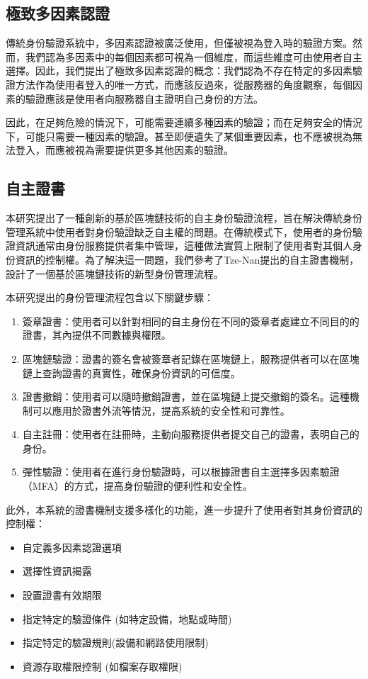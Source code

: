 \subsection{極致多因素認證}
傳統身份驗證系統中，多因素認證被廣泛使用，但僅被視為登入時的驗證方案。然而，我們認為多因素中的每個因素都可視為一個維度，而這些維度可由使用者自主選擇。因此，我們提出了極致多因素認證的概念：我們認為不存在特定的多因素驗證方法作為使用者登入的唯一方式，而應該反過來，從服務器的角度觀察，每個因素的驗證應該是使用者向服務器自主證明自己身份的方法。

因此，在足夠危險的情況下，可能需要連續多種因素的驗證；而在足夠安全的情況下，可能只需要一種因素的驗證。甚至即便遺失了某個重要因素，也不應被視為無法登入，而應被視為需要提供更多其他因素的驗證。
\subsection{自主證書}
本研究提出了一種創新的基於區塊鏈技術的自主身份驗證流程，旨在解決傳統身份管理系統中使用者對身份驗證缺乏自主權的問題。在傳統模式下，使用者的身份驗證資訊通常由身份服務提供者集中管理，這種做法實質上限制了使用者對其個人身份資訊的控制權。為了解決這一問題，我們參考了Tze-Nan\cite{NTU202102846}提出的自主證書機制，設計了一個基於區塊鏈技術的新型身份管理流程。

本研究提出的身份管理流程包含以下關鍵步驟：
\begin{enumerate}
  \item 簽章證書：使用者可以針對相同的自主身份在不同的簽章者處建立不同目的的證書，其內提供不同數據與權限。
  \item 區塊鏈驗證：證書的簽名會被簽章者記錄在區塊鏈上，服務提供者可以在區塊鏈上查詢證書的真實性，確保身份資訊的可信度。
  \item 證書撤銷：使用者可以隨時撤銷證書，並在區塊鏈上提交撤銷的簽名。這種機制可以應用於證書外流等情況，提高系統的安全性和可靠性。
  \item 自主註冊：使用者在註冊時，主動向服務提供者提交自己的證書，表明自己的身份。
  \item 彈性驗證：使用者在進行身份驗證時，可以根據證書自主選擇多因素驗證（MFA）的方式，提高身份驗證的便利性和安全性。
\end{enumerate}
此外，本系統的證書機制支援多樣化的功能，進一步提升了使用者對其身份資訊的控制權：
\begin{itemize}
  \item 自定義多因素認證選項
  \item 選擇性資訊揭露
  \item 設置證書有效期限
  \item 指定特定的驗證條件 (如特定設備，地點或時間)
  \item 指定特定的驗證規則(設備和網路使用限制)
  \item 資源存取權限控制 (如檔案存取權限)
\end{itemize}

